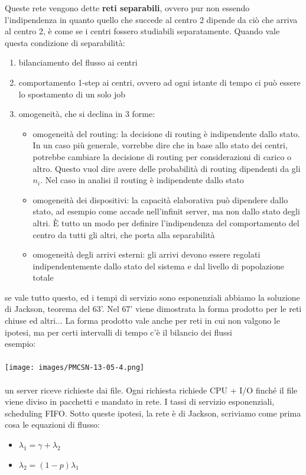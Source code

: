 \documentclass{article}
\begin{document}
Queste rete vengono dette \textbf{reti separabili}, ovvero pur non essendo l'indipendenza in quanto quello che succede al centro 2 dipende da ciò che arriva al centro 2, è come se i centri fossero studiabili separatamente. Quando vale questa condizione di separabilità:
\begin{enumerate}
\item bilanciamento del flusso ai centri
\item comportamento 1-step ai centri, ovvero ad ogni istante di tempo ci può essere lo spostamento di un solo job
\item omogeneità, che si declina in 3 forme:
\begin{itemize}
\item omogeneità del routing: la decisione di routing è indipendente dallo stato. In un caso più generale, vorrebbe dire che in base allo stato dei centri, potrebbe cambiare la decisione di routing per considerazioni di carico o altro. Questo vuol dire avere delle probabilità di routing dipendenti da gli $n_i$. Nel caso in analisi il routing è indipendente dallo stato
\item omogeneità dei dispositivi: la capacità elaborativa può dipendere dallo stato, ad esempio come accade nell'infinit server, ma non dallo stato degli altri. È tutto un modo per definire l'indipendenza del comportamento del centro da tutti gli altri, che porta alla separabilità
\item omogeneità degli arrivi esterni: gli arrivi devono essere regolati indipendentemente dallo stato del sistema e dal livello di popolazione totale
\end{itemize}
\end{enumerate}
se vale tutto questo, ed i tempi di servizio sono esponenziali abbiamo la soluzione di Jackson, teorema del 63'. Nel 67' viene dimostrata la forma prodotto per le reti chiuse ed altri... La forma prodotto vale anche per reti in cui non valgono le ipotesi, ma per certi intervalli di tempo c'è il bilancio dei flussi\\
esempio:\\\\
\texttt{[image: images/PMCSN-13-05-4.png]} \\\\
un server riceve richieste dai file. Ogni richiesta richiede CPU + I/O finché il file viene diviso in pacchetti e mandato in rete. I tassi di servizio esponenziali, scheduling FIFO. Sotto queste ipotesi, la rete è di Jackson, scriviamo come prima cosa le equazioni di flusso:
\begin{itemize}
\item $\lambda_1 = \gamma + \lambda_2$
\item $\lambda_2 = (1-p)\lambda_1$
\end{itemize}
\end{document}
